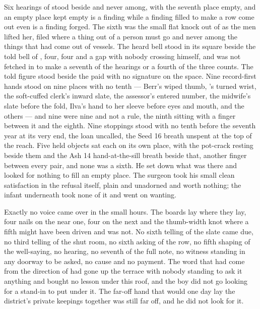 Six hearings of  stood beside and never among, with the seventh place empty, and an empty place kept empty is a finding while a finding filled to make a row come out even is a finding forged. The sixth was the small flat knock out of  as the men lifted her, filed where a thing out of a person must go and never among the things that had come out of vessels. The heard bell stood in its square beside the told bell of , four, four and a gap with nobody crossing himself, and was not fetched in to make a seventh of the hearings or a fourth of the three counts. The told figure stood beside the paid with no signature on the space. Nine record-first hands stood on nine places with no tenth --- Berr's wiped thumb, 's turned wrist, the soft-cuffed clerk's inward slate, the assessor's entered number, the midwife's slate before the fold, Ilva's hand to her sleeve before eyes and mouth, and the others --- and nine were nine and not a rule, the ninth sitting with a finger between it and the eighth. Nine stoppings stood with no tenth before the seventh year at its very end, the loan uncalled, the Seed 16 breath unspent at the top of the reach. Five held objects sat each on its own place, with the pot-crack resting beside them and the Ash 14 hand-at-the-sill breath beside that, another finger between every pair, and none was a sixth. He set down what was there and looked for nothing to fill an empty place. The surgeon took his small clean satisfaction in the refusal itself, plain and unadorned and worth nothing; the infant underneath took none of it and went on wanting.

Exactly no voice came over  in the small hours. The boards lay where they lay, four nails on the near one, four on the next and the thumb-width knot where a fifth might have been driven and was not. No sixth telling of the slate came due, no third telling of the shut room, no sixth asking of the row, no fifth shaping of the well-saying, no hearing, no seventh of the full note, no witness standing in any doorway to be asked, no cause and no payment. The word that had come from the direction of  had gone up the terrace with nobody standing to ask it anything and bought no lesson under this roof, and the boy did not go looking for a stand-in to put under it. The far-off hand that would one day lay the district's private keepings together was still far off, and he did not look for it.

